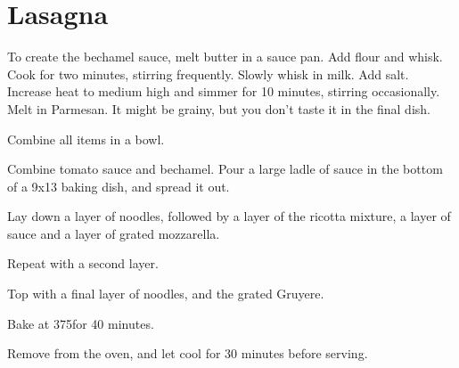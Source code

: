 \section{Lasagna}

\begin{recipe}


To create the bechamel sauce, melt butter in a sauce pan. Add flour and whisk. Cook for two minutes, stirring frequently. Slowly whisk in milk. Add salt. Increase heat to medium high and simmer for 10 minutes, stirring occasionally. Melt in Parmesan. It might be grainy, but you don't taste it in the final dish.


Combine all items in a bowl.


Combine tomato sauce and bechamel. Pour a large ladle of sauce in the bottom of a 9x13 baking dish, and spread it out.

Lay down a layer of noodles, followed by a layer of the ricotta mixture, a layer of sauce and a layer of grated mozzarella.

Repeat with a second layer.


Top with a final layer of noodles, and the grated Gruyere.

Bake at 375\degree for 40 minutes.

Remove from the oven, and let cool for 30 minutes before serving.


\end{recipe}

